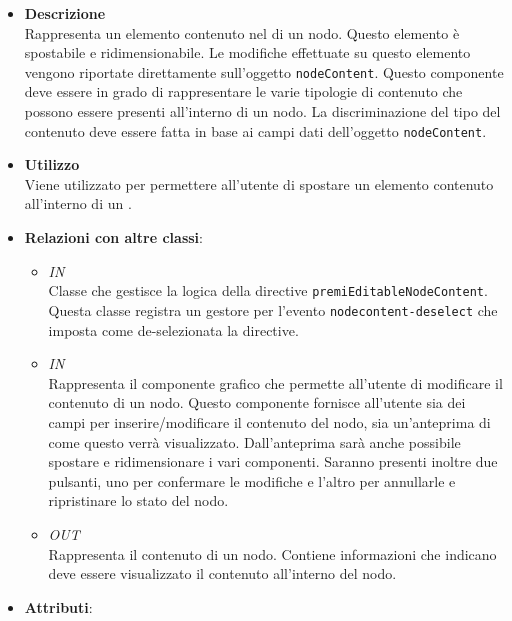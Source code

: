 \begin{itemize}
\item \textbf{Descrizione}\\
Rappresenta un elemento contenuto nel  di un nodo. Questo elemento è spostabile e ridimensionabile. Le modifiche effettuate su questo elemento vengono riportate direttamente sull’oggetto \texttt{nodeContent}.
Questo componente deve essere in grado di rappresentare le varie tipologie di contenuto che possono essere presenti all’interno di un nodo. La discriminazione del tipo del contenuto deve essere fatta in base ai campi dati dell’oggetto \texttt{nodeContent}.
\item \textbf{Utilizzo}\\
Viene utilizzato per permettere all'utente di spostare un elemento contenuto all'interno di un .
\item \textbf{Relazioni con altre classi}:
\begin{itemize}
\item \textit{IN} \hyperref[\nogloxy{Premi::Front-End::Controllers::EditableNodeContentController}]{}\\
Classe che gestisce la logica della directive \texttt{premiEditableNodeContent}. Questa classe registra un gestore per l'evento \texttt{nodecontent-deselect} che imposta come de-selezionata la directive.
\item \textit{IN} \hyperref[\nogloxy{Premi::Front-End::Directives::premiNodeContentsEditor}]{}\\
Rappresenta il componente grafico che permette all’utente di modificare il contenuto di un nodo. Questo componente fornisce all’utente sia dei campi per inserire/modificare il contenuto del nodo, sia un’anteprima di come questo verrà visualizzato. Dall’anteprima sarà anche possibile spostare e ridimensionare i vari componenti.
Saranno presenti inoltre due pulsanti, uno per confermare le modifiche e l’altro per annullarle e ripristinare lo stato del nodo.
\item \textit{OUT} \hyperref[\nogloxy{Premi::Front-End::Model::NodeContent}]{}\\
Rappresenta il contenuto di un nodo. Contiene informazioni che indicano deve essere visualizzato il contenuto all’interno del nodo.
\end{itemize}
\item \textbf{Attributi}:
\begin{itemize}

\end{itemize}
\end{itemize}
